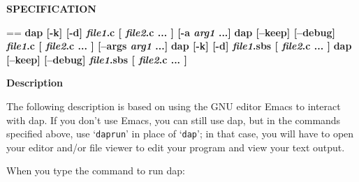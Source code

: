 \documentclass{book}
\makeatletter
\newcommand\Texinfocommandstyletextvar[1]{{\normalfont{}\textsl{#1}}}%
\newenvironment{Texinfopreformatted}{%
  \par\GNUTobeylines\obeyspaces\frenchspacing\parskip=\z@\parindent=\z@}{}
{\catcode`\^^M=13 \gdef\GNUTobeylines{\catcode`\^^M=13 \def^^M{\null\par}}}
\newenvironment{Texinfoindented}{\begin{list}{}{}\item\relax}{\end{list}}
\renewcommand{\_}{\Texinfounderscore\discretionary{}{}{}}
\makeatother
\begin{document}
\noindent{}\textbf{SPECIFICATION}

\begin{Texinfoindented}
\begin{Texinfopreformatted}%
\textbf{dap [-k] [-d] \Texinfocommandstyletextvar{file1}.c [ \Texinfocommandstyletextvar{file2}.c ... ] [-a \Texinfocommandstyletextvar{arg1} ...]}
\textbf{dap [--keep] [--debug] \Texinfocommandstyletextvar{file1}.c [ \Texinfocommandstyletextvar{file2}.c ... ] [--args \Texinfocommandstyletextvar{arg1} ...]}
\textbf{dap [-k] [-d] \Texinfocommandstyletextvar{file1}.sbs [ \Texinfocommandstyletextvar{file2}.c ... ]}
\textbf{dap [--keep] [--debug] \Texinfocommandstyletextvar{file1}.sbs [ \Texinfocommandstyletextvar{file2}.c ... ]}
\end{Texinfopreformatted}
\end{Texinfoindented}

\noindent{}\textbf{Description}

The following description is based on using the GNU editor Emacs to
interact with dap.
If you don't use Emacs, you can still use dap, but in the commands
specified above, use `\texttt{daprun}' in place of `\texttt{dap}'; in that case,
you will have to open your editor and/or file viewer to edit your program
and view your text output.

When you type the command to run dap:
\end{document}
